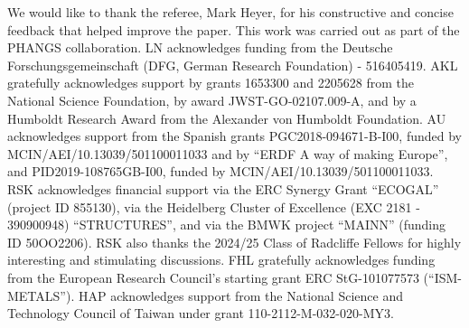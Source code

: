 \documentclass[letter, longauth]{aa} %
\begin{document}
\begin{acknowledgements}
We would like to thank the referee, Mark Heyer, for his constructive and concise feedback that helped improve the paper. 
This work was carried out as part of the PHANGS collaboration.
LN acknowledges funding from the Deutsche Forschungsgemeinschaft (DFG, German Research Foundation) - 516405419.
AKL gratefully acknowledges support by grants 1653300 and 2205628 from the National Science Foundation, by award JWST-GO-02107.009-A, and by a Humboldt Research Award from the Alexander von Humboldt Foundation.
AU acknowledges support from the Spanish grants PGC2018-094671-B-I00, funded by MCIN/AEI/10.13039/501100011033 and by ``ERDF A way of making Europe'', and PID2019-108765GB-I00, funded by MCIN/AEI/10.13039/501100011033.
RSK acknowledges financial support via the ERC Synergy Grant ``ECOGAL'' (project ID 855130), via the Heidelberg Cluster of Excellence (EXC 2181 - 390900948) ``STRUCTURES'', and via the BMWK project ``MAINN'' (funding ID 50OO2206). RSK also thanks the 2024/25 Class of Radcliffe Fellows for highly interesting and stimulating discussions.
FHL gratefully acknowledges funding from the European Research Council’s starting grant ERC StG-101077573 (“ISM-METALS”).
HAP acknowledges support from the National Science and Technology Council of Taiwan under grant 110-2112-M-032-020-MY3.


\end{acknowledgements}
\end{document}
